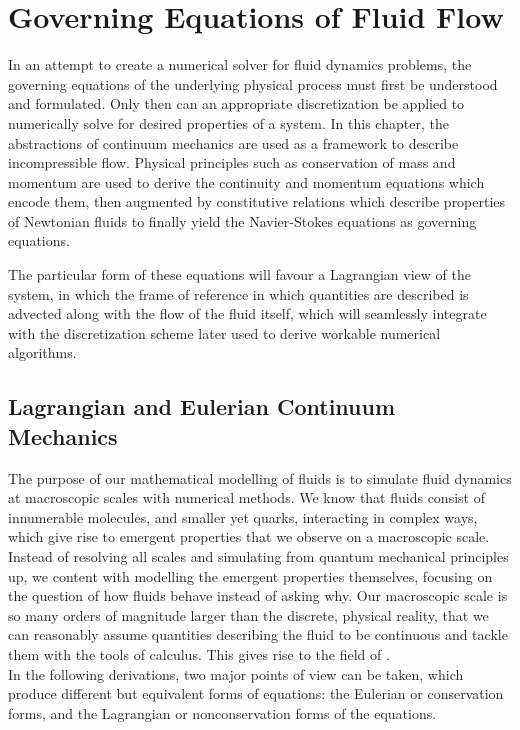 \chapter{Governing Equations of Fluid Flow}\label{chp:governing-equations}
In an attempt to create a numerical solver for fluid dynamics problems, the governing equations of the underlying physical process must first be understood and formulated. Only then can an appropriate discretization be applied to numerically solve for desired properties of a system. In this chapter, the abstractions of continuum mechanics are used as a framework to describe incompressible flow. Physical principles such as conservation of mass and momentum are used to derive the continuity and momentum equations which encode them, then augmented by constitutive relations which describe properties of Newtonian fluids to finally yield the Navier-Stokes equations as governing equations.
\autocite*{anderson}\autocite*{tutorial}

The particular form of these equations will favour a Lagrangian view of the system, in which the frame of reference in which quantities are described is advected along with the flow of the fluid itself, which will seamlessly integrate with the discretization scheme later used to derive workable numerical algorithms.



\section{Lagrangian and Eulerian Continuum Mechanics}
The purpose of our mathematical modelling of fluids is to simulate fluid dynamics at macroscopic scales with numerical methods. We know that fluids consist of innumerable molecules, and smaller yet quarks, interacting in complex ways, which give rise to emergent properties that we observe on a macroscopic scale. Instead of resolving all scales and simulating from quantum mechanical principles up, we content with modelling the emergent properties themselves, focusing on the question of how fluids behave instead of asking why. Our macroscopic scale is so many orders of magnitude larger than the discrete, physical reality, that we can reasonably assume quantities describing the fluid to be continuous and tackle them with the tools of calculus. This gives rise to the field of .\\
In the following derivations, two major points of view can be taken, which produce different but equivalent forms of equations: the Eulerian or conservation forms, and the Lagrangian or nonconservation forms of the equations\autocite*{anderson}.

